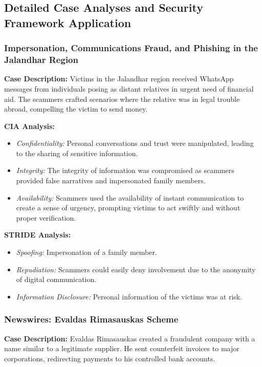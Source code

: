\documentclass[11pt]{article}
\begin{document}
\subsection{Detailed Case Analyses and Security Framework Application}

\subsubsection*{Impersonation, Communications Fraud, and Phishing in the Jalandhar Region}
\textbf{Case Description:} Victims in the Jalandhar region received WhatsApp messages from individuals posing as distant relatives in urgent need of financial aid. The scammers crafted scenarios where the relative was in legal trouble abroad, compelling the victim to send money.

\textbf{CIA Analysis:}
\begin{itemize}
    \item \textit{Confidentiality:} Personal conversations and trust were manipulated, leading to the sharing of sensitive information.
    \item \textit{Integrity:} The integrity of information was compromised as scammers provided false narratives and impersonated family members.
    \item \textit{Availability:} Scammers used the availability of instant communication to create a sense of urgency, prompting victims to act swiftly and without proper verification.
\end{itemize}

\textbf{STRIDE Analysis:}
\begin{itemize}
    \item \textit{Spoofing:} Impersonation of a family member.
    \item \textit{Repudiation:} Scammers could easily deny involvement due to the anonymity of digital communication.
    \item \textit{Information Disclosure:} Personal information of the victims was at risk.
\end{itemize}

\subsubsection*{Newswires: Evaldas Rimasauskas Scheme}
\textbf{Case Description:} Evaldas Rimasauskas created a fraudulent company with a name similar to a legitimate supplier. He sent counterfeit invoices to major corporations, redirecting payments to his controlled bank accounts.
\end{document}
